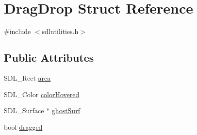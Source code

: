 \hypertarget{structDragDrop}{
\section{DragDrop Struct Reference}
\label{structDragDrop}
}


{\ttfamily \#include $<$sdlutilities.h$>$}

\subsection*{Public Attributes}
\begin{DoxyCompactItemize}
\item 
SDL\_\-Rect \hyperlink{structDragDrop_aaa9d7144adb66cd87910e73e84e0dfcb}{area}
\item 
SDL\_\-Color \hyperlink{structDragDrop_ae8b5a2b5ceed22163e3572f6df9c9f89}{colorHovered}
\item 
SDL\_\-Surface $\ast$ \hyperlink{structDragDrop_a5ddaa34d10935b8d93a056b45893fb47}{ghostSurf}
\item 
bool \hyperlink{structDragDrop_a41aaa4bda1eed39e08b926b46101c723}{dragged}
\end{DoxyCompactItemize}


